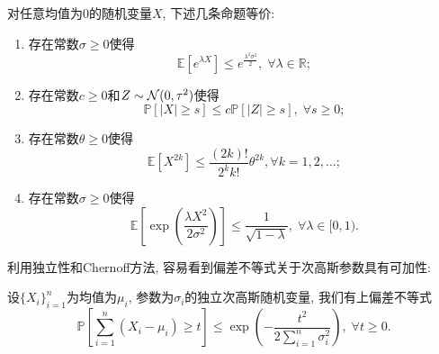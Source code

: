 \begin{theorem}[次高斯随机变量的等价定义]
	对任意均值为$0$的随机变量$X$, 下述几条命题等价: 
	\begin{enumerate}[label=(\Roman*)]
		\item 存在常数$\sigma \geq 0$使得
			\begin{equation*}
				\mathbb{E}[e^{\lambda X} ] \leq e^{\frac{\lambda^2 \sigma^2}{2}},\; \forall \lambda \in \mathbb{R}; 
			\end{equation*}
		\item 存在常数$c \geq 0$和$Z \sim \mathcal{N}(0, \tau^2)$使得
			\begin{equation*}
				\mathbb{P}[|X| \geq s] \leq c \mathbb{P}[|Z| \geq s],\; \forall s \geq 0; 
			\end{equation*}
		\item 存在常数$\theta \geq 0$使得
			\begin{equation*}
				\mathbb{E}[X^{2k}] \leq \frac{(2k)!}{2^k k!} \theta^{2k}, \forall k = 1,2,\dots;
			\end{equation*}
		\item 存在常数$\sigma \geq 0$使得
			\begin{equation*}
				\mathbb{E}\left[ \exp\left(\frac{\lambda X^2}{2 \sigma^2}\right) \right] \leq \frac{1}{\sqrt{1 - \lambda}},\; \forall \lambda \in [0,1).
			\end{equation*}
	\end{enumerate}
\end{theorem}

利用独立性和Chernoff方法, 容易看到偏差不等式关于次高斯参数具有可加性: 
\begin{proposition}[Hoeffding界]
	设$\{X_i\}_{i=1}^n$为均值为$\mu_i$, 参数为$\sigma_i$的独立次高斯随机变量, 我们有上偏差不等式
	\begin{equation}
		\mathbb{P} \left[ \sum_{i=1}^n (X_i - \mu_i) \geq t \right]
		\leq \exp \left( - \frac{t^2}{2 \sum_{i=1}^n \sigma_i^2} \right ),\; 
		\forall t \geq 0.
	\end{equation}
\end{proposition}

